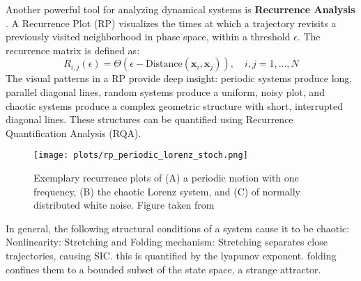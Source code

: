 \documentclass[a4paper,12pt]{article}
\begin{document}
Another powerful tool for analyzing dynamical systems is \textbf{Recurrence Analysis} \cite{MARWAN2007237}. A Recurrence Plot (RP) visualizes the times at which a trajectory revisits a previously visited neighborhood in phase space, within a threshold $\epsilon$. The recurrence matrix is defined as:
\begin{equation}
    R_{i,j}(\epsilon) = \Theta(\epsilon - \text{Distance}(\mathbf{x}_i, \mathbf{x}_j)), \quad i,j = 1, \dots, N 
\end{equation}
The visual patterns in a RP provide deep insight: periodic systems produce long, parallel diagonal lines, random systems produce a uniform, noisy plot, and chaotic systems produce a complex geometric structure with short, interrupted diagonal lines. These structures can be quantified using Recurrence Quantification Analysis (RQA).

\begin{figure}[H]
    \centering
    \texttt{[image: plots/rp\_periodic\_lorenz\_stoch.png]}
    \caption{Exemplary recurrence plots of (A) a periodic motion with one frequency, (B) the chaotic Lorenz system, and (C) of normally distributed white noise. Figure taken from \cite{DONNER_2011}}
    \label{fig:rp_examples}
\end{figure}


In general, the following structural conditions of a system cause it to be chaotic:
Nonlinearity: %
Stretching and Folding mechanism: Stretching separates close trajectories, causing SIC. this is quantified by the lyapunov exponent. folding confines them to a bounded subset of the state space, a strange attractor.
\cite{Hnon1976ATM}
\cite{ROSSLER1976}
\cite{strogatz_textbook}
\end{document}

